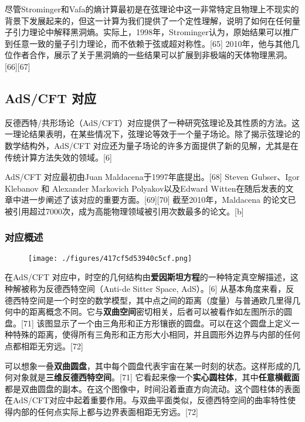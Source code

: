 尽管Strominger和Vafa的熵计算最初是在弦理论中这一非常特定且物理上不现实的背景下发展起来的，但这一计算为我们提供了一个定性理解，说明了如何在任何量子引力理论中解释黑洞熵。实际上，1998年，Strominger认为，原始结果可以推广到任意一致的量子引力理论，而不依赖于弦或超对称性。[65] 2010年，他与其他几位作者合作，展示了关于黑洞熵的一些结果可以扩展到非极端的天体物理黑洞。[66][67]
\subsection{AdS/CFT 对应}
反德西特/共形场论（AdS/CFT）对应提供了一种研究弦理论及其性质的方法。这一理论结果表明，在某些情况下，弦理论等效于一个量子场论。除了揭示弦理论的数学结构外，AdS/CFT 对应还为量子场论的许多方面提供了新的见解，尤其是在传统计算方法失效的领域。[6]  

AdS/CFT 对应最初由Juan Maldacena于1997年底提出。[68] Steven Gubser、Igor Klebanov 和 Alexander Markovich Polyakov以及Edward Witten在随后发表的文章中进一步阐述了该对应的重要方面。[69][70] 截至2010年，Maldacena 的论文已被引用超过7000次，成为高能物理领域被引用次数最多的论文。[b]
\subsubsection{对应概述}
\begin{figure}[ht]
\centering
\texttt{[image: ./figures/417cf5d53940c5cf.png]}
\caption{} \label{fig_String_8}
\end{figure}
在AdS/CFT 对应中，时空的几何结构由\textbf{爱因斯坦方程}的一种特定真空解描述，这种解被称为反德西特空间（Anti-de Sitter Space, AdS）。[6] 从基本角度来看，反德西特空间是一个时空的数学模型，其中点之间的距离（度量）与普通欧几里得几何中的距离概念不同。它与\textbf{双曲空间}密切相关，后者可以被看作如左图所示的圆盘。[71] 该图显示了一个由三角形和正方形镶嵌的圆盘。可以在这个圆盘上定义一种特殊的距离，使得所有三角形和正方形大小相同，并且圆形外边界与内部的任何点都相距无穷远。[72]  

可以想象一叠\textbf{双曲圆盘}，其中每个圆盘代表宇宙在某一时刻的状态。这样形成的几何对象就是\textbf{三维反德西特空间}。[71] 它看起来像一个\textbf{实心圆柱体}，其中\textbf{任意横截面}都是双曲圆盘的副本。在这个图像中，时间沿着垂直方向流动。这个圆柱体的表面在AdS/CFT对应中起着重要作用。与双曲平面类似，反德西特空间的曲率特性使得内部的任何点实际上都与边界表面相距无穷远。[72]